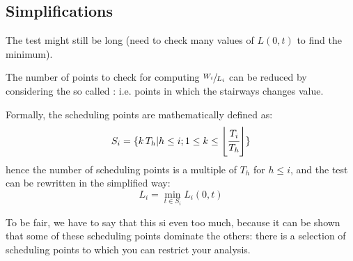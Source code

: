 \subsection{Simplifications}
The test might still be long (need to check many values of $L(0, t)$ to find the minimum).

The number of points to check for computing $\sfrac{W_i}{L_i}$ can be reduced by considering the so called : i.e. points in which the stairways changes value.

Formally, the scheduling points are mathematically defined as:
\[S_i = \{k\,T_h | h \le i; 1 \le k \le \left\lfloor \cfrac{T_i}{T_h} \right\rfloor\}\]
hence the number of scheduling points is a multiple of $T_h$ for $h \le i$, and the test can be rewritten in the simplified way:
\[L_i = \min_{t\in S_i} L_i(0,t)\]

To be fair, we have to say that this si even too much, because it can be shown that some of these scheduling points dominate the others: there is a selection of scheduling points to which you can restrict your analysis.

 














